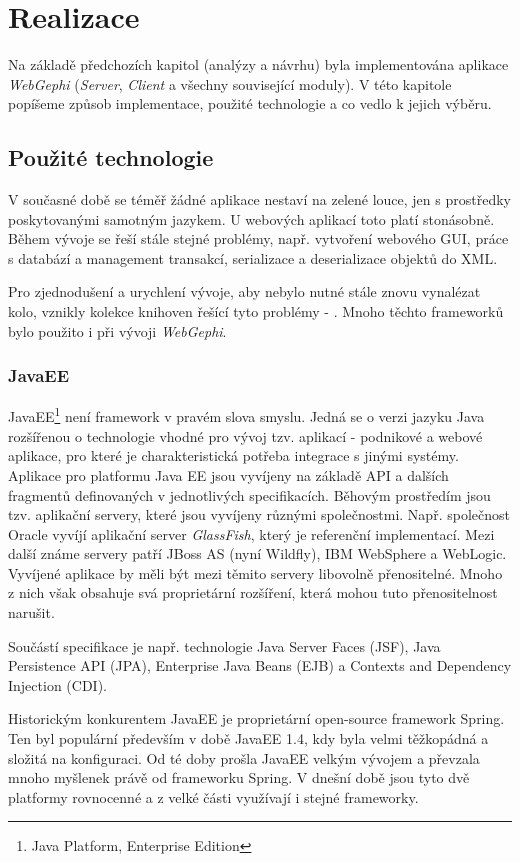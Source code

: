 \documentclass[thesis=M,czech]{FITthesis}[2014/05/6]
\begin{document}
\chapter{Realizace}
Na základě předchozích kapitol (analýzy a návrhu) byla implementována aplikace \textit{WebGephi} (\textit{Server}, \textit{Client} a všechny související moduly).
V této kapitole popíšeme způsob implementace, použité technologie a co vedlo k jejich výběru.

\section{Použité technologie}
V současné době se téměř žádné aplikace nestaví na zelené louce, jen s prostředky poskytovanými samotným jazykem. U webových aplikací 
toto platí stonásobně. Během vývoje se řeší stále stejné problémy, např. vytvoření webového GUI, práce s databází a management transakcí, serializace a deserializace 
objektů do XML.

Pro zjednodušení a urychlení vývoje, aby nebylo nutné stále znovu vynalézat kolo, vznikly kolekce knihoven řešící tyto problémy - . Mnoho 
těchto frameworků bylo použito i při vývoji \textit{WebGephi}. 

\subsection{JavaEE\cite{javaEE}}
JavaEE\footnote{Java Platform, Enterprise Edition} není framework v pravém slova smyslu. Jedná se o verzi jazyku Java 
rozšířenou o technologie vhodné pro vývoj tzv.  aplikací - podnikové a webové aplikace, pro které je charakteristická potřeba 
integrace s jinými systémy. Aplikace pro platformu Java EE jsou vyvíjeny na základě API a dalších fragmentů definovaných v jednotlivých specifikacích.
Běhovým prostředím jsou tzv. aplikační servery, které jsou vyvíjeny různými společnostmi. Např. společnost Oracle vyvíjí aplikační server \textit{GlassFish}, který je
referenční implementací. Mezi další známe servery patří JBoss AS (nyní Wildfly), IBM WebSphere a WebLogic.
Vyvíjené aplikace by měli být mezi těmito servery libovolně přenositelné. Mnoho z nich však obsahuje svá proprietární rozšíření, která mohou tuto přenositelnost narušit.

Součástí specifikace je např. technologie Java Server Faces (JSF), Java Persistence API (JPA), Enterprise Java Beans (EJB) a Contexts and Dependency Injection (CDI). 

Historickým konkurentem
JavaEE je proprietární open-source framework Spring\cite{spring}. Ten byl populární především v době JavaEE 1.4, kdy byla velmi těžkopádná a složitá na konfiguraci. Od té doby prošla JavaEE
velkým vývojem a převzala mnoho myšlenek právě od frameworku Spring. V dnešní době jsou tyto dvě platformy rovnocenné a z velké části využívají i stejné frameworky.
\end{document}
